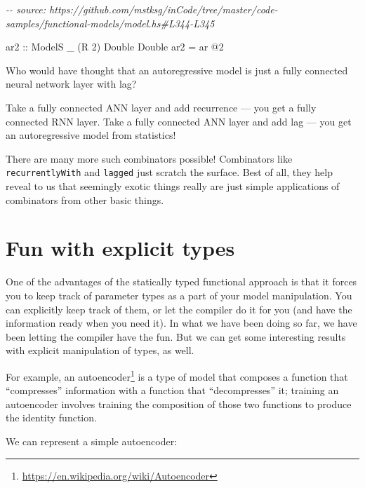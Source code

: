 \documentclass[]{article}
\newenvironment{Shaded}{}{}
\newcommand{\CommentTok}[1]{\textcolor[rgb]{0.38,0.63,0.69}{\textit{#1}}}
\newcommand{\DataTypeTok}[1]{\textcolor[rgb]{0.56,0.13,0.00}{#1}}
\newcommand{\DecValTok}[1]{\textcolor[rgb]{0.25,0.63,0.44}{#1}}
\newcommand{\NormalTok}[1]{#1}
\newcommand{\OperatorTok}[1]{\textcolor[rgb]{0.40,0.40,0.40}{#1}}
\newcommand{\OtherTok}[1]{\textcolor[rgb]{0.00,0.44,0.13}{#1}}
\renewcommand{\href}[2]{#2\footnote{\url{#1}}}
\begin{document}
\begin{Shaded}
\begin{Highlighting}[]
\CommentTok{{-}{-} source: https://github.com/mstksg/inCode/tree/master/code{-}samples/functional{-}models/model.hs\#L344{-}L345}

\OtherTok{ar2\textquotesingle{} ::} \DataTypeTok{ModelS}\NormalTok{ \_ (}\DataTypeTok{R} \DecValTok{2}\NormalTok{) }\DataTypeTok{Double} \DataTypeTok{Double}
\NormalTok{ar2\textquotesingle{} }\OtherTok{=}\NormalTok{ ar }\OperatorTok{@}\DecValTok{2}
\end{Highlighting}
\end{Shaded}

Who would have thought that an autoregressive model is just a fully connected
neural network layer with lag?

Take a fully connected ANN layer and add recurrence --- you get a fully
connected RNN layer. Take a fully connected ANN layer and add lag --- you get an
autoregressive model from statistics!

There are many more such combinators possible! Combinators like
\texttt{recurrentlyWith} and \texttt{lagged} just scratch the surface. Best of
all, they help reveal to us that seemingly exotic things really are just simple
applications of combinators from other basic things.

\section{Fun with explicit types}\label{fun-with-explicit-types}

One of the advantages of the statically typed functional approach is that it
forces you to keep track of parameter types as a part of your model
manipulation. You can explicitly keep track of them, or let the compiler do it
for you (and have the information ready when you need it). In what we have been
doing so far, we have been letting the compiler have the fun. But we can get
some interesting results with explicit manipulation of types, as well.

For example, an \href{https://en.wikipedia.org/wiki/Autoencoder}{autoencoder} is
a type of model that composes a function that ``compresses'' information with a
function that ``decompresses'' it; training an autoencoder involves training the
composition of those two functions to produce the identity function.

We can represent a simple autoencoder:
\end{document}

